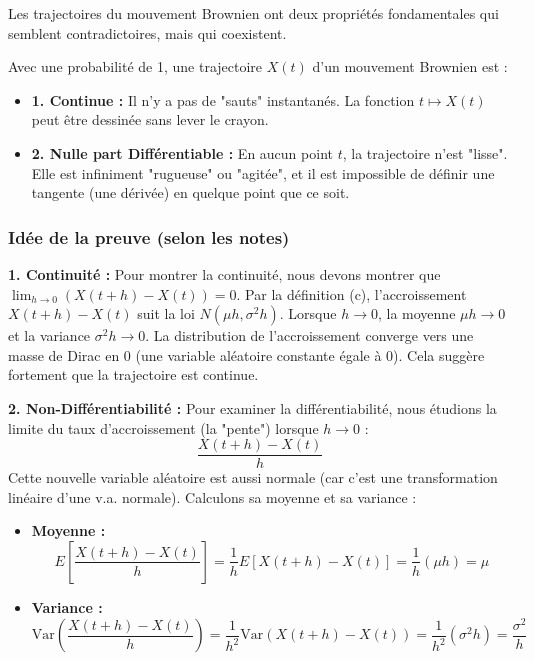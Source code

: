 Les trajectoires du mouvement Brownien ont deux propriétés fondamentales qui semblent contradictoires, mais qui coexistent.

\begin{intuitionbox}
Avec une probabilité de 1, une trajectoire $X(t)$ d'un mouvement Brownien est :
\begin{itemize}
    \item \textbf{1. Continue :} Il n'y a pas de "sauts" instantanés. La fonction $t \mapsto X(t)$ peut être dessinée sans lever le crayon.
    \item \textbf{2. Nulle part Différentiable :} En aucun point $t$, la trajectoire n'est "lisse". Elle est infiniment "rugueuse" ou "agitée", et il est impossible de définir une tangente (une dérivée) en quelque point que ce soit.
\end{itemize}
\end{intuitionbox}

\subsubsection*{Idée de la preuve (selon les notes)}

\textbf{1. Continuité :}
Pour montrer la continuité, nous devons montrer que $\lim_{h \to 0} (X(t+h) - X(t)) = 0$.
Par la définition (c), l'accroissement $X(t+h) - X(t)$ suit la loi $N(\mu h, \sigma^2 h)$.
Lorsque $h \to 0$, la moyenne $\mu h \to 0$ et la variance $\sigma^2 h \to 0$.
La distribution de l'accroissement converge vers une masse de Dirac en 0 (une variable aléatoire constante égale à 0). Cela suggère fortement que la trajectoire est continue.

\textbf{2. Non-Différentiabilité :}
Pour examiner la différentiabilité, nous étudions la limite du taux d'accroissement (la "pente") lorsque $h \to 0$ :
$$ \frac{X(t+h) - X(t)}{h} $$
Cette nouvelle variable aléatoire est aussi normale (car c'est une transformation linéaire d'une v.a. normale). Calculons sa moyenne et sa variance :

\begin{itemize}
    \item \textbf{Moyenne :} 
    $$ E\left[ \frac{X(t+h) - X(t)}{h} \right] = \frac{1}{h} E[X(t+h) - X(t)] = \frac{1}{h} (\mu h) = \mu $$
    
    \item \textbf{Variance :} 
    $$ \text{Var}\left( \frac{X(t+h) - X(t)}{h} \right) = \frac{1}{h^2} \text{Var}(X(t+h) - X(t)) = \frac{1}{h^2} (\sigma^2 h) = \frac{\sigma^2}{h} $$
\end{itemize}

